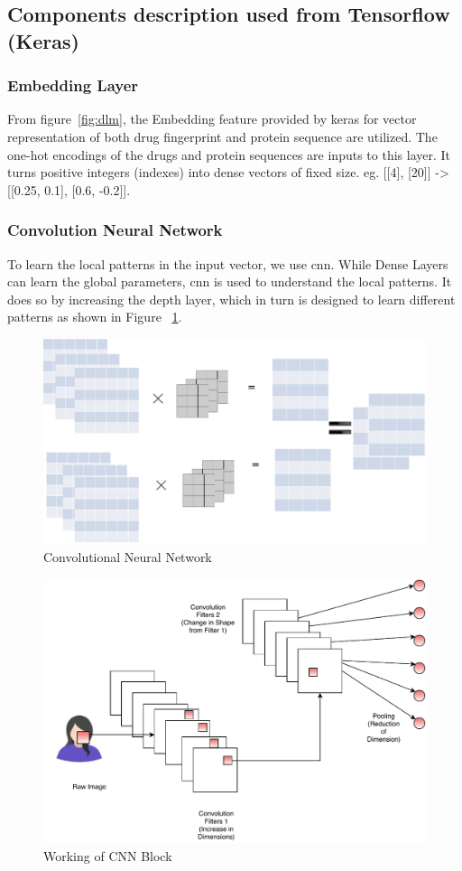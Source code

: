   \subsection{Components description used from Tensorflow (Keras)}
  \subsubsection{Embedding Layer}
  From figure~\ref{fig:dlm}, the Embedding feature provided by keras for vector representation of both drug fingerprint and protein sequence are utilized. The one-hot encodings of the drugs and protein sequences are inputs to this layer. It turns positive integers (indexes) into dense vectors of fixed size. eg. [[4], [20]] -> [[0.25, 0.1], [0.6, -0.2]].

  \subsubsection{Convolution Neural Network}
  To learn the local patterns in the input vector, we use \acrshort{cnn}. While Dense Layers can learn the global parameters, \acrshort{cnn} is used to understand the local patterns. It does so by increasing the depth layer, which in turn is designed to learn different patterns as shown in Figure ~\ref{fig:cnn}.
  \begin{figure}[H]
    \centering
    \includegraphics[width=.8\linewidth]{mainmatter/3-Methodology/images/cnn.png}
    \caption{Convolutional Neural Network}
    \label{fig:cnn}
  \end{figure} 

  \begin{figure}
    \centering
    \includegraphics[width=.5\linewidth]{mainmatter/3-Methodology/images/System-Block-CNN-Layer.pdf}
    \caption{Working of CNN Block}
    \label{fig:cnn-2}
  \end{figure}
  
